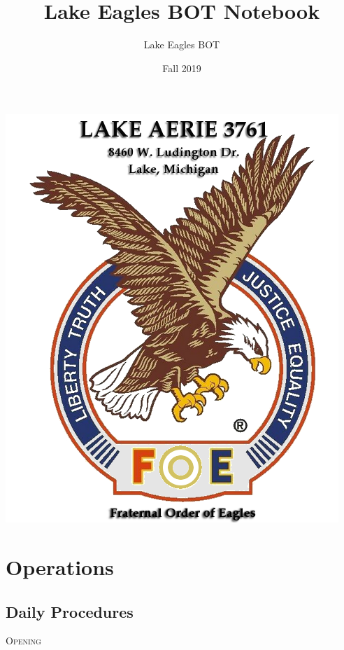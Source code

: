 \documentclass{tufte-handout}
\title{Lake Eagles BOT Notebook}
\author[BOT]{Lake Eagles BOT}
\date{Fall 2019}
\begin{document}
\maketitle

\begin{marginfigure}%
  \includegraphics[width=\linewidth]{Lake_Aerie_3761}
\end{marginfigure}

\begin{abstract}

\end{abstract}

\section{Operations}

\subsection{Daily Procedures}
\begin{center}
\textsc{Opening}
\end{center}
\end{document}
